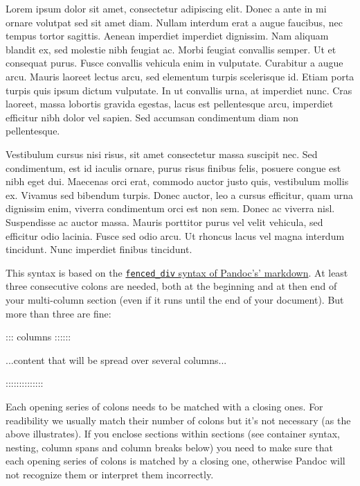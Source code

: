 \documentclass[
]{article}
\newenvironment{Shaded}{}{}
\newcommand{\NormalTok}[1]{#1}
\begin{document}
{\begin{multicols}{2}

Lorem ipsum dolor sit amet, consectetur adipiscing elit. Donec a ante in
mi ornare volutpat sed sit amet diam. Nullam interdum erat a augue
faucibus, nec tempus tortor sagittis. Aenean imperdiet imperdiet
dignissim. Nam aliquam blandit ex, sed molestie nibh feugiat ac. Morbi
feugiat convallis semper. Ut et consequat purus. Fusce convallis
vehicula enim in vulputate. Curabitur a augue arcu. Mauris laoreet
lectus arcu, sed elementum turpis scelerisque id. Etiam porta turpis
quis ipsum dictum vulputate. In ut convallis urna, at imperdiet nunc.
Cras laoreet, massa lobortis gravida egestas, lacus est pellentesque
arcu, imperdiet efficitur nibh dolor vel sapien. Sed accumsan
condimentum diam non pellentesque.

Vestibulum cursus nisi risus, sit amet consectetur massa suscipit nec.
Sed condimentum, est id iaculis ornare, purus risus finibus felis,
posuere congue est nibh eget dui. Maecenas orci erat, commodo auctor
justo quis, vestibulum mollis ex. Vivamus sed bibendum turpis. Donec
auctor, leo a cursus efficitur, quam urna dignissim enim, viverra
condimentum orci est non sem. Donec ac viverra nisl. Suspendisse ac
auctor massa. Mauris porttitor purus vel velit vehicula, sed efficitur
odio lacinia. Fusce sed odio arcu. Ut rhoncus lacus vel magna interdum
tincidunt. Nunc imperdiet finibus tincidunt.

\end{multicols}
}

This syntax is based on the
\href{https://pandoc.org/MANUAL.html\#divs-and-spans}{\texttt{fenced\_div}
syntax of Pandoc's' markdown}. At least three consecutive colons are
needed, both at the beginning and at then end of your multi-column
section (even if it runs until the end of your document). But more than
three are fine:

\begin{Shaded}
\begin{Highlighting}[]
\NormalTok{::: columns ::::::}

\NormalTok{...content that will be spread over several columns...}

\NormalTok{::::::::::::::}
\end{Highlighting}
\end{Shaded}

Each opening series of colons needs to be matched with a closing ones.
For readibility we usually match their number of colons but it's not
necessary (as the above illustrates). If you enclose sections within
sections (see container syntax, nesting, column spans and column breaks
below) you need to make sure that each opening series of colons is
matched by a closing one, otherwise Pandoc will not recognize them or
interpret them incorrectly.
\end{document}
